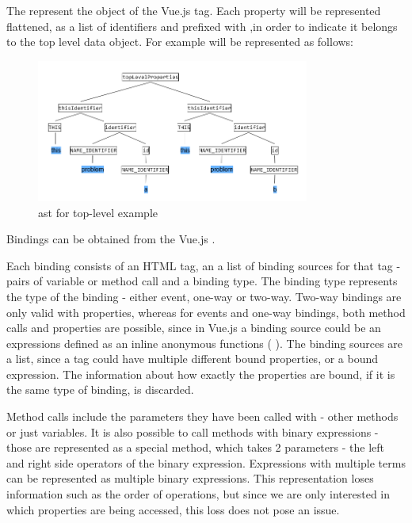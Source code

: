 The  represent the  object of the Vue.js  tag. Each property will be represented flattened, as a list of identifiers and prefixed with ,in order to indicate it belongs to the top level data object. For example  will be represented as follows:

\begin{figure}[H]
    \includegraphics[width=0.8\textwidth]{images/ast_top_level.png}
     \caption{\gls{ast} for top-level example }
     \label{fig:ast_top_level}
\end{figure}

Bindings can be obtained from the Vue.js .

Each binding consists of an HTML tag, an a list of binding sources for that tag - pairs of variable or method call and a binding type. The binding type represents the type of the binding - either event, one-way or two-way. Two-way bindings are only valid with properties, whereas for events and one-way bindings, both method calls and properties are possible, since in Vue.js a binding source could be an expressions defined as an inline anonymous functions (
). The binding sources are a list, since a tag could have multiple different bound properties, or a bound expression. The information about how exactly the properties are bound, if it is the same type of binding, is discarded.

Method calls include the parameters they have been called with - other methods or just variables. It is also possible to call methods with binary expressions - those are represented as a special method, which takes 2 parameters - the left and right side operators of the binary expression. Expressions with multiple terms can be represented as multiple binary expressions. This representation loses information such as the order of operations, but since we are only interested in which properties are being accessed, this loss does not pose an issue.


